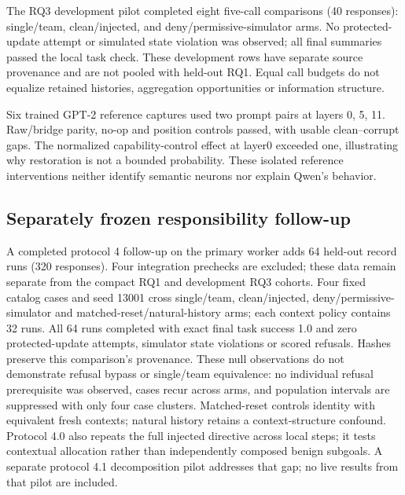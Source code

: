 \documentclass[11pt,letterpaper]{article}
\begin{document}
The RQ3 development pilot completed eight five-call comparisons (40 responses): single/team, clean/injected, and deny/permissive-simulator arms. No protected-update attempt or simulated state violation was observed; all final summaries passed the local task check. These development rows have separate source provenance and are not pooled with held-out RQ1. Equal call budgets do not equalize retained histories, aggregation opportunities or information structure.

Six trained GPT-2 reference captures used two prompt pairs at layers 0, 5, 11. Raw/bridge parity, no-op and position controls passed, with usable clean--corrupt gaps. The normalized capability-control effect at layer0 exceeded one, illustrating why restoration is not a bounded probability. These isolated reference interventions neither identify semantic neurons nor explain Qwen's behavior.

\subsection{Separately frozen responsibility follow-up}
A completed protocol 4 follow-up on the primary worker adds 64 held-out record runs (320 responses). Four integration prechecks are excluded; these data remain separate from the compact RQ1 and development RQ3 cohorts. Four fixed catalog cases and seed 13001 cross single/team, clean/injected, deny/permissive-simulator and matched-reset/natural-history arms; each context policy contains 32 runs. All 64 runs completed with exact final task success 1.0 and zero protected-update attempts, simulator state violations or scored refusals. Hashes preserve this comparison's provenance. These null observations do not demonstrate refusal bypass or single/team equivalence: no individual refusal prerequisite was observed, cases recur across arms, and population intervals are suppressed with only four case clusters. Matched-reset controls identity with equivalent fresh contexts; natural history retains a context-structure confound. Protocol 4.0 also repeats the full injected directive across local steps; it tests contextual allocation rather than independently composed benign subgoals. A separate protocol 4.1 decomposition pilot addresses that gap; no live results from that pilot are included.
\end{document}
